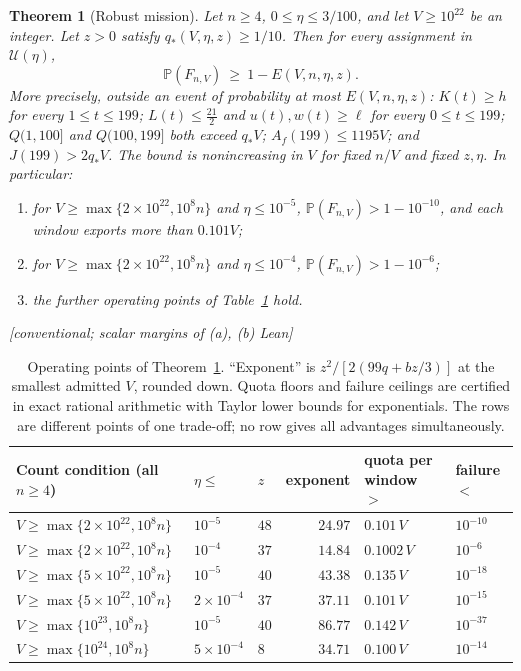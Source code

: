 \documentclass[11pt,letterpaper]{article}
\theoremstyle{plain}
\newtheorem{theorem}{Theorem}[section]
\theoremstyle{definition}
\theoremstyle{remark}
\numberwithin{equation}{section}
\newcommand{\PP}{\mathbb P}
\newcommand{\cU}{\mathcal U}
\newcommand{\evid}[1]{{\normalfont\small\textsf{[}#1\textsf{]}}}
\begin{document}
\begin{theorem}[Robust mission]\label{thm:main}
Let $n\ge4$, $0\le\eta\le3/100$, and let $V\ge10^{22}$ be an integer. Let $z>0$ satisfy $q_*(V,\eta,z)\ge1/10$. Then for every assignment in $\cU(\eta)$,
\begin{equation}\label{eq:mainbound}
 \PP(F_{n,V})\ \ge\ 1-E(V,n,\eta,z).
\end{equation}
More precisely, outside an event of probability at most $E(V,n,\eta,z)$: $K(t)\ge h$ for every $1\le t\le199$; $L(t)\le\tfrac{21}2$ and $u(t),w(t)\ge\ell$ for every $0\le t\le199$; $Q(1,100]$ and $Q(100,199]$ both exceed $q_*V$; $A_f(199)\le1195V$; and $J(199)>2q_*V$. The bound is nonincreasing in $V$ for fixed $n/V$ and fixed $z,\eta$. In particular:
\begin{enumerate}[label=(\alph*)]
\item for $V\ge\max\{2\times10^{22},10^8n\}$ and $\eta\le10^{-5}$, $\PP(F_{n,V})>1-10^{-10}$, and each window exports more than $0.101V$;
\item for $V\ge\max\{2\times10^{22},10^8n\}$ and $\eta\le10^{-4}$, $\PP(F_{n,V})>1-10^{-6}$;
\item the further operating points of Table~\ref{tab:points} hold.
\end{enumerate}
\evid{conventional; scalar margins of \textup{(a)}, \textup{(b)} Lean}
\end{theorem}

\begin{table}[t]
\centering\small
\begin{tabular}{@{}lllrll@{}}
\toprule
Count condition (all $n\ge4$) & $\eta\le$ & $z$ & exponent & quota per window $>$ & failure $<$\\
\midrule
$V\ge\max\{2\times10^{22},10^8n\}$ & $10^{-5}$ & $48$ & $24.97$ & $0.101\,V$ & $10^{-10}$\\
$V\ge\max\{2\times10^{22},10^8n\}$ & $10^{-4}$ & $37$ & $14.84$ & $0.1002\,V$ & $10^{-6}$\\
$V\ge\max\{5\times10^{22},10^8n\}$ & $10^{-5}$ & $40$ & $43.38$ & $0.135\,V$ & $10^{-18}$\\
$V\ge\max\{5\times10^{22},10^8n\}$ & $2\times10^{-4}$ & $37$ & $37.11$ & $0.101\,V$ & $10^{-15}$\\
$V\ge\max\{10^{23},10^8n\}$ & $10^{-5}$ & $40$ & $86.77$ & $0.142\,V$ & $10^{-37}$\\
$V\ge\max\{10^{24},10^8n\}$ & $5\times10^{-4}$ & $8$ & $34.71$ & $0.100\,V$ & $10^{-14}$\\
\bottomrule
\end{tabular}
\caption{Operating points of Theorem~\ref{thm:main}. ``Exponent'' is $z^2/[2(99q+bz/3)]$ at the smallest admitted $V$, rounded down. Quota floors and failure ceilings are certified in exact rational arithmetic with Taylor lower bounds for exponentials. The rows are different points of one trade-off; no row gives all advantages simultaneously.}
\label{tab:points}
\end{table}
\end{document}
